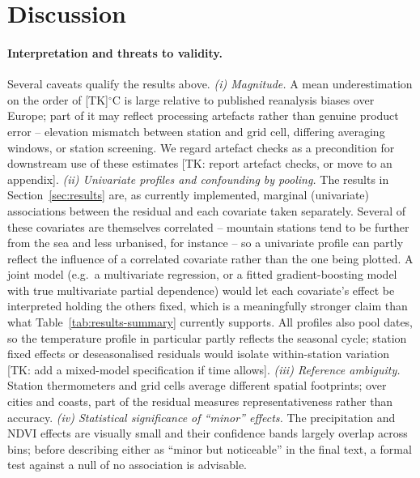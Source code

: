 \documentclass[a4paper,12pt,leqno]{article}
\begin{document}
\section{Discussion}
\label{sec:discussion}

\paragraph{Interpretation and threats to validity.}
Several caveats qualify the results above. \emph{(i) Magnitude.} A mean
underestimation on the order of [TK]$^\circ$C is large relative to
published reanalysis biases over Europe; part of it may reflect
processing artefacts rather than genuine product error -- elevation
mismatch between station and grid cell, differing averaging windows, or
station screening. We regard artefact checks as a precondition for
downstream use of these estimates [TK: report artefact checks, or move
to an appendix]. \emph{(ii) Univariate profiles and confounding by
pooling.} The results in Section~\ref{sec:results} are, as currently
implemented, marginal (univariate) associations between the residual and
each covariate taken separately. Several of these covariates are
themselves correlated -- mountain stations tend to be further from the
sea and less urbanised, for instance -- so a univariate profile can
partly reflect the influence of a correlated covariate rather than the
one being plotted. A joint model (e.g.\ a multivariate regression, or a
fitted gradient-boosting model with true multivariate partial
dependence) would let each covariate's effect be interpreted holding the
others fixed, which is a meaningfully stronger claim than what
Table~\ref{tab:results-summary} currently supports. All profiles also
pool dates, so the temperature profile in particular partly reflects the
seasonal cycle; station fixed effects or deseasonalised residuals would
isolate within-station variation [TK: add a mixed-model specification if
time allows]. \emph{(iii) Reference ambiguity.} Station thermometers and
grid cells average different spatial footprints; over cities and coasts,
part of the residual measures representativeness rather than accuracy.
\emph{(iv) Statistical significance of ``minor'' effects.} The
precipitation and NDVI effects are visually small and their confidence
bands largely overlap across bins; before describing either as
``minor but noticeable'' in the final text, a formal test against a null
of no association is advisable.
\end{document}

